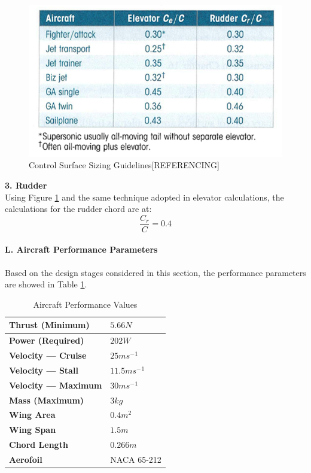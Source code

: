 \documentclass[12pt]{article}
\begin{document}
\begin{figure}[h!]
    \includegraphics[width=12cm, scale=1]{elevatorandrudder.png}
    \caption{Control Surface Sizing Guidelines[REFERENCING]}
    \label{fig:elevatorandrudder}
\end{figure}

\noindent \textbf{3. Rudder} \\
\noindent Using Figure \ref{fig:elevatorandrudder} and the same technique adopted in elevator calculations, the calculations for the rudder chord are at: \\

\begin{equation} \label{eq}
\frac{C_r}{C}=0.4
\end{equation}

\paragraph{L. Aircraft Performance Parameters} Based on the design stages considered in this section, the performance parameters are showed in Table \ref{thing}. 

\begin{table}[h!]
\centering
\begin{tabular}{|l|l|}
\hline
\textbf{Thrust (Minimum)} & $5.66N$
\\ \hline \textbf{Power (Required)} & $202W$ 
\\ \hline \textbf{Velocity --- Cruise} & $25ms{{^-}^1}$ 
\\ \hline \textbf{Velocity --- Stall} & $11.5ms{{^-}^1}$ 
\\ \hline \textbf{Velocity --- Maximum } & $30ms{{^-}^1}$ 
\\ \hline \textbf{Mass (Maximum)} & $3kg$ 
\\ \hline \textbf{Wing Area} & $0.4m^2$ 
\\ \hline \textbf{Wing Span} & $1.5m$ 
\\ \hline \textbf{Chord Length} & $0.266m$ 
\\ \hline \textbf{Aerofoil} & NACA 65-212 
\\ \hline
\end{tabular}
\caption{Aircraft Performance Values}
\label{thing}
\end{table}
\end{document}
